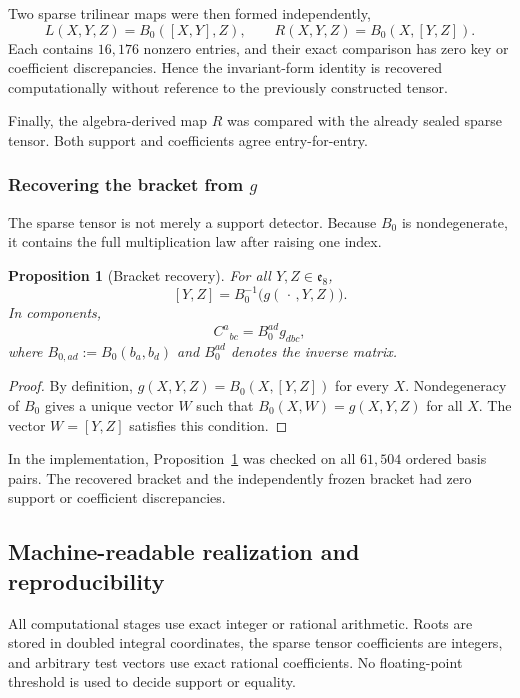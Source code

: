 \documentclass[11pt]{article}
\newtheorem{proposition}[theorem]{Proposition}
\theoremstyle{definition}
\theoremstyle{remark}
\newcommand{\e}{\mathfrak e}
\begin{document}
Two sparse trilinear maps were then formed independently,
\[
L(X,Y,Z)=B_0([X,Y],Z),
\qquad
R(X,Y,Z)=B_0(X,[Y,Z]).
\]
Each contains $16{,}176$ nonzero entries, and their exact comparison has zero key or coefficient discrepancies.  Hence the invariant-form identity is recovered computationally without reference to the previously constructed tensor.

Finally, the algebra-derived map $R$ was compared with the already sealed sparse tensor.  Both support and coefficients agree entry-for-entry.

\subsubsection{Recovering the bracket from \texorpdfstring{$g$}{g}}

The sparse tensor is not merely a support detector.  Because $B_0$ is nondegenerate, it contains the full multiplication law after raising one index.

\begin{proposition}[Bracket recovery]\label{prop:bracketrecovery}
For all $Y,Z\in\e_8$,
\[
[Y,Z]=B_0^{-1}\bigl(g(\,\cdot\,,Y,Z)\bigr).
\]
In components,
\[
C^{a}{}_{bc}=B_0^{ad}g_{dbc},
\]
where $B_{0,ad}:=B_0(b_a,b_d)$ and $B_0^{ad}$ denotes the inverse matrix.
\end{proposition}

\begin{proof}
By definition, $g(X,Y,Z)=B_0(X,[Y,Z])$ for every $X$.  Nondegeneracy of $B_0$ gives a unique vector $W$ such that $B_0(X,W)=g(X,Y,Z)$ for all $X$.  The vector $W=[Y,Z]$ satisfies this condition.
\end{proof}

In the implementation, Proposition~\ref{prop:bracketrecovery} was checked on all $61{,}504$ ordered basis pairs.  The recovered bracket and the independently frozen bracket had zero support or coefficient discrepancies.

\subsection{Machine-readable realization and reproducibility}\label{sec:data}

All computational stages use exact integer or rational arithmetic.  Roots are stored in doubled integral coordinates, the sparse tensor coefficients are integers, and arbitrary test vectors use exact rational coefficients.  No floating-point threshold is used to decide support or equality.
\end{document}
